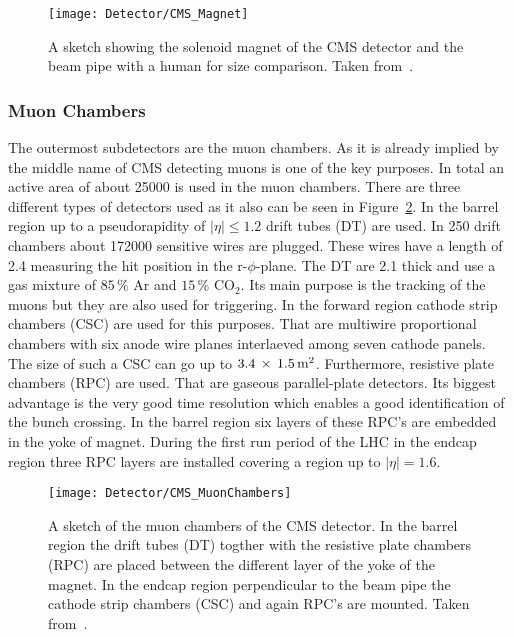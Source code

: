 \begin{figure}[!Hhtb]
  \centering
  \texttt{[image: Detector/CMS\_Magnet]}
  \caption[Sketch of the solenoid magnet]{A sketch showing the solenoid magnet of the CMS detector and the beam pipe with a human for size comparison. Taken from~. \label{plot:LHCCMSMagnetCMS}}
\end{figure}

\subsubsection{Muon Chambers}

The outermost subdetectors are the muon chambers. As it is already implied by the middle name of CMS detecting muons is one of the key purposes. In total an active area of about 25000\ms{} is used in the muon chambers. There are three different types of detectors used as it also can be seen in Figure~\ref{plot:LHCCMSMuonChambersCMS}. In the barrel region up to a pseudorapidity of $\left|\eta{}\right| \leq{} 1.2$ drift tubes (DT) are used. In 250 drift chambers about 172000 sensitive wires are plugged. These wires have a length of 2.4\m{} measuring the hit position in the r-$\phi{}$-plane. The DT are 2.1\cm{} thick and use a gas mixture of $85\,\%$ Ar and $15\,\%$ $\text{CO}_{\text{2}}$. Its main purpose is the tracking of the muons but they are also used for triggering. In the forward region cathode strip chambers (CSC) are used for this purposes. That are multiwire proportional chambers with six anode wire planes interlaeved among seven cathode panels. The size of such a CSC can go up to $3.4\,\times{}\,1.5\,\text{m}^{\text{2}}{}$. Furthermore, resistive plate chambers (RPC) are used. That are gaseous parallel-plate detectors. Its biggest advantage is the very good time resolution which enables a good identification of the bunch crossing. In the barrel region six layers of these RPC's are embedded in the yoke of magnet. During the first run period of the LHC in the endcap region three RPC layers are installed covering a region up to $\left|\eta{}\right| = 1.6$.

\begin{figure}[!Hhtb]
  \centering
  \texttt{[image: Detector/CMS\_MuonChambers]}
  \caption[Sketch of the muon chambers of CMS]{A sketch of the muon chambers of the CMS detector. In the barrel region the drift tubes (DT) togther with the resistive plate chambers (RPC) are placed between the different layer of the yoke of the magnet. In the endcap region perpendicular to the beam pipe the cathode strip chambers (CSC) and again RPC's are mounted. Taken from~. \label{plot:LHCCMSMuonChambersCMS}}
\end{figure}


